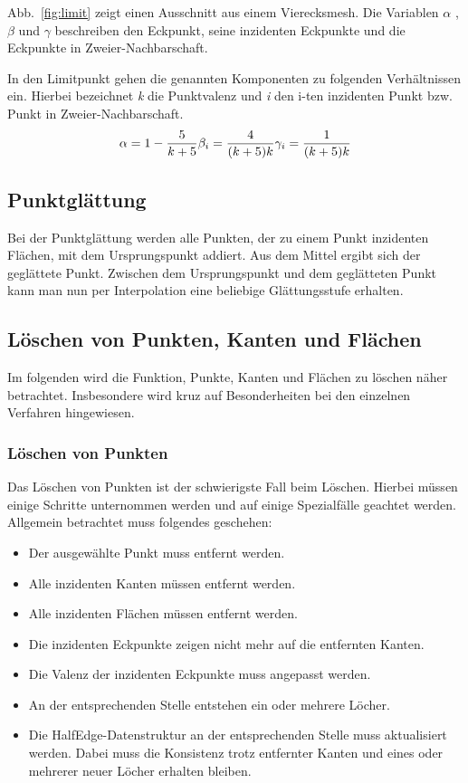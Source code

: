Abb.~\ref{fig:limit} zeigt einen Ausschnitt aus einem Vierecksmesh.
Die Variablen $\alpha$ , $\beta$ und $\gamma$ beschreiben den Eckpunkt, seine inzidenten Eckpunkte und die Eckpunkte in Zweier-Nachbarschaft.  

In den Limitpunkt gehen die genannten Komponenten zu folgenden Verhältnissen ein. Hierbei bezeichnet \emph{k} die Punktvalenz und \emph{i} den i-ten inzidenten Punkt bzw. Punkt in Zweier-Nachbarschaft.
\begin{equation}
\alpha = 1-\dfrac{5}{k+5}\\
\beta_i = \dfrac{4}{(k+5)k}\\
\gamma_i = \dfrac{1}{(k+5)k}
\end{equation}


\subsection{Punktglättung}
Bei der Punktglättung werden alle Punkten, der zu einem Punkt inzidenten Flächen, mit dem Ursprungspunkt addiert. 
Aus dem Mittel ergibt sich der geglättete Punkt. 
Zwischen dem Ursprungspunkt und dem geglätteten Punkt kann man nun per Interpolation eine beliebige Glättungsstufe erhalten.

\subsection{Löschen von Punkten, Kanten und Flächen}
Im folgenden wird die Funktion, Punkte, Kanten und Flächen zu löschen näher betrachtet.
Insbesondere wird kruz auf Besonderheiten bei den einzelnen Verfahren hingewiesen.
\subsubsection{Löschen von Punkten}
Das Löschen von Punkten ist der schwierigste Fall beim Löschen. Hierbei müssen einige Schritte unternommen werden und auf einige Spezialfälle geachtet werden. 
Allgemein betrachtet muss folgendes geschehen:
\begin{itemize}
\item Der ausgewählte Punkt muss entfernt werden.
\item Alle inzidenten Kanten müssen entfernt werden.
\item Alle inzidenten Flächen müssen entfernt werden.
\item Die inzidenten Eckpunkte zeigen nicht mehr auf die entfernten Kanten.
\item Die Valenz der inzidenten Eckpunkte muss angepasst werden.
\item An der entsprechenden Stelle entstehen ein oder mehrere Löcher.
\item Die HalfEdge-Datenstruktur an der entsprechenden Stelle muss aktualisiert werden. Dabei muss die Konsistenz trotz entfernter Kanten und eines oder mehrerer neuer Löcher erhalten bleiben.
\end{itemize}

